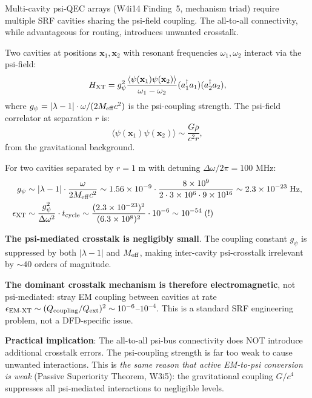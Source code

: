 \documentclass[11pt]{article}
\theoremstyle{definition}
\theoremstyle{remark}
\newcommand{\ee}[1]{\times 10^{#1}}
\newcommand{\lamdiff}{|\lambda-1|}
\begin{document}
\begin{tcolorbox}[colback=blue!5!white, colframe=blue!60!black,
  title=\textbf{W4i15 TOP 5 FINDINGS --- READ FIRST}]
\begin{enumerate}[nosep]
  Multi-cavity psi-QEC arrays (W4i14 Finding~5, mechanism triad) require
  multiple SRF cavities sharing the psi-field coupling.  The all-to-all
  connectivity, while advantageous for routing, introduces unwanted
  crosstalk.

  Two cavities at positions $\mathbf{x}_1, \mathbf{x}_2$ with resonant
  frequencies $\omega_1, \omega_2$ interact via the psi-field:
  \begin{equation}
    H_{\rm XT} = g_\psi^2 \frac{\langle \psi(\mathbf{x}_1) \psi(\mathbf{x}_2)\rangle}
    {\omega_1 - \omega_2} (a_1^\dagger a_1)(a_2^\dagger a_2),
  \end{equation}
  where $g_\psi = \lamdiff \cdot \omega / (2 M_{\rm eff} c^2)$ is the
  psi-coupling strength.  The psi-field correlator at separation $r$ is:
  \begin{equation}
    \langle \psi(\mathbf{x}_1) \psi(\mathbf{x}_2)\rangle
    \sim \frac{G \bar{\rho}}{c^2 r},
  \end{equation}
  from the gravitational background.

  For two cavities separated by $r = 1$ m with detuning
  $\Delta\omega/2\pi = 100$ MHz:
  \begin{align}
    g_\psi &\sim \lamdiff \cdot \frac{\omega}{2 M_{\rm eff} c^2}
    \sim 1.56\ee{-9} \cdot \frac{8\ee{9}}{2 \cdot 3\ee{6} \cdot 9\ee{16}}
    \sim 2.3\ee{-23}\;\text{Hz}, \\
    \epsilon_{\rm XT} &\sim \frac{g_\psi^2}{\Delta\omega^2} \cdot t_{\rm cycle}
    \sim \frac{(2.3\ee{-23})^2}{(6.3\ee{8})^2} \cdot 10^{-6}
    \sim 10^{-54}\;\text{(!)}
  \end{align}

  \textbf{The psi-mediated crosstalk is negligibly small}.  The coupling
  constant $g_\psi$ is suppressed by both $\lamdiff$ and $M_{\rm eff}$,
  making inter-cavity psi-crosstalk irrelevant by $\sim 40$ orders of
  magnitude.

  \textbf{The dominant crosstalk mechanism is therefore electromagnetic},
  not psi-mediated: stray EM coupling between cavities at rate
  $\epsilon_{\rm EM\text{-}XT} \sim (Q_{\rm coupling}/Q_{\rm ext})^2
  \sim 10^{-6}$--$10^{-4}$.  This is a standard SRF engineering problem,
  not a DFD-specific issue.

  \textbf{Practical implication}: The all-to-all psi-bus connectivity
  does NOT introduce additional crosstalk errors.  The psi-coupling
  strength is far too weak to cause unwanted interactions.  This is
  \emph{the same reason that active EM-to-psi conversion is weak}
  (Passive Superiority Theorem, W3i5): the gravitational coupling
  $G/c^4$ suppresses all psi-mediated interactions to negligible levels.


\end{enumerate}
\end{tcolorbox}
\end{document}

